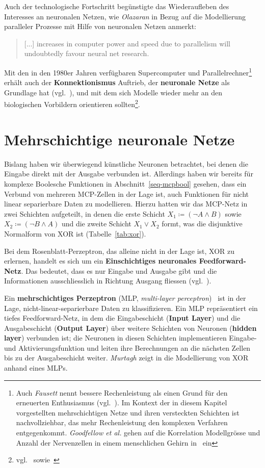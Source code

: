 Auch der technologische Fortschritt begünstigte das Wiederaufleben des Interesses an neuronalen Netzen, wie \textit{Olazaran} in Bezug auf die Modellierung paralleler Prozesse mit Hilfe von neuronalen Netzen anmerkt:

\blockquote[{\cite[644]{Ola96}}]{
    [...] increases in computer power and speed due to parallelism will undoubtedly favour neural net research.
}

Mit den in den 1980er Jahren verfügbaren Supercomputer und Parallelrechner\footnote{
    Auch \textit{Fausett} nennt bessere Rechenleistung als einen Grund für den erneuerten Enthusiasmus (vgl.~\cite[26]{Fau94}). Im Kontext der in diesem Kapitel vorgestellten mehrschichtigen Netze und ihren  versteckten Schichten ist nachvollziehbar, das mehr Rechenleistung den komplexen Verfahren entgegenkommt. \textit{Goodfellow et al.} gehen auf die Korrelation Modellgrösse und Anzahl der Nervenzellen in einem menschlichen Gehirn in~\cite[24 f.]{GBC18} ein
} erhält auch der \textbf{Konnektionismus} Auftrieb, der \textbf{neuronale Netze} als Grundlage hat (vgl.~\cite[15]{Dor91}), und mit dem sich Modelle wieder mehr an den biologischen Vorbildern orientieren sollten\footnote{
    vgl.~\cite[43]{RM87} sowie~\cite[18 f.]{GBC18}}.


\section{Mehrschichtige neuronale Netze}

Bislang haben wir überwiegend künstliche Neuronen betrachtet, bei denen die Eingabe direkt mit der Ausgabe verbunden ist. Allerdings haben wir bereits für komplexe Boolesche Funktionen in Abschnitt~\ref{seq-mcpbool} gesehen, dass ein Verbund von mehreren MCP-Zellen in der Lage ist, auch Funktionen für nicht linear separierbare Daten zu modellieren. Hierzu hatten wir das MCP-Netz in zwei Schichten aufgeteilt, in denen die erste Schicht $X_1 \coloneqq (\neg A \land B)$ sowie $X_2 \coloneqq (\neg B \land A)$ und die zweite Schicht $X_1 \lor X_2$ formt, was die disjunktive Normalform von XOR ist (Tabelle~\ref{tab:xor}).

Bei dem Rosenblatt-Perzeptron, das alleine nicht in der Lage ist, XOR zu erlernen, handelt es sich um ein \textbf{Einschichtiges neuronales Feedforward-Netz}.
Das bedeutet, dass es nur Eingabe und Ausgabe gibt und die Informationen ausschliesslich in Richtung Ausgang fliessen (vgl.~\cite[848]{RN09}).

Ein \textbf{mehrschichtiges Perzeptron} (MLP, \textit{multi-layer perceptron})~\cite[6]{GBC18} ist in der Lage, nicht-linear-separierbare Daten zu klassifizieren.
Ein MLP repräsentiert ein tiefes Feedforward-Netz, in dem die Eingabeschicht (\textbf{Input Layer}) und die Ausgabeschicht (\textbf{Output Layer}) über weitere Schichten von Neuronen (\textbf{hidden layer}) verbunden ist; die Neuronen in diesen Schichten implementieren Eingabe- und Aktivierungsfunktion und leiten ihre Berechnungen an die nächsten Zellen bis zu der Ausgabeschicht weiter. \textit{Murtagh} zeigt in \cite[184 f.]{Mur91} die Modellierung von XOR anhand eines MLPs.

